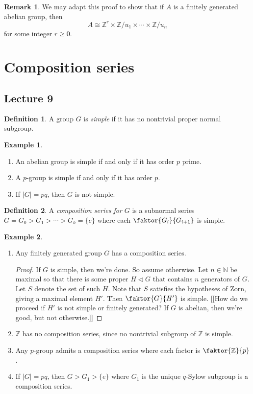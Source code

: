 \documentclass[10pt,letterpaper,cm]{nupset}
\theoremstyle{definition}
\newtheorem*{definition}{Definition}
\newtheorem{exmp}{Example}
\newtheorem{remark}{Remark}
\newcommand{\N}{\mathbb N}
\newcommand{\Z}{\mathbb Z}
\newcommand{\1}{\mathbf{1}}
\newcommand{\0}{\vec 0}
\begin{document}
\begin{remark}
We may adapt this proof to show that if $A$ is a finitely generated abelian group, then $$A \cong \Z^r \times \Z/u_1 \times \cdots \times \Z/u_n$$ for some integer $r\geq 0$. 
\end{remark}

\section{Composition series}

\subsection{Lecture 9}

\begin{definition}
A group $G$ is \textit{simple} if it has no nontrivial proper normal subgroup.
\end{definition}

\begin{exmp} $ $
\begin{enumerate}
\item An abelian group is simple if and only if it has order $p$ prime.
\item A $p$-group is simple if and only if it has order $p$.
\item If $|G| = pq$, then $G$ is not simple.
\end{enumerate}
\end{exmp}

\begin{definition}
A \textit{composition series for $G$} is a subnormal series $G = G_0 > G_1 > \cdots > G_k = \{e\}$ where each $\faktor{G_i}{G_{i+1}}$ is simple.
\end{definition}

\begin{exmp} $ $
\begin{enumerate}
\item Any finitely generated group $G$ has a composition series.
\begin{proof}
If $G$ is simple, then we're done. So assume otherwise. Let $n\in \N$ be maximal so that there is some proper $H \lhd G$ that contains $n$ generators of $G$. Let $S$ denote the set of such $H$. Note that $S$ satisfies the hypotheses of Zorn, giving a maximal element $H'$. Then $\faktor{G}{H'}$ is simple. {[[How do we proceed if $H'$ is not simple or finitely generated? If $G$ is abelian, then we're good, but not otherwise.]]}
\end{proof}
\item $\Z$ has no composition series, since no nontrivial subgroup of $\Z$ is simple.
\item Any $p$-group admits a composition series where each factor is $\faktor{\Z}{p}$.
\item If $|G|= pq$, then $G > G_1 > \{e\}$ where $G_1$ is the unique $q$-Sylow subgroup is a composition series.
\end{enumerate}
\end{exmp}
\end{document}
